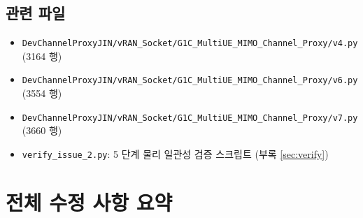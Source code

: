 \documentclass[11pt,a4paper]{article}
\begin{document}
\subsection{관련 파일}
\begin{itemize}
  \item \texttt{DevChannelProxyJIN/vRAN\_Socket/G1C\_MultiUE\_MIMO\_Channel\_Proxy/v4.py}
        \quad (3164 행)
  \item \texttt{DevChannelProxyJIN/vRAN\_Socket/G1C\_MultiUE\_MIMO\_Channel\_Proxy/v6.py}
        \quad (3554 행)
  \item \texttt{DevChannelProxyJIN/vRAN\_Socket/G1C\_MultiUE\_MIMO\_Channel\_Proxy/v7.py}
        \quad (3660 행)
  \item \texttt{verify\_issue\_2.py}: 5 단계 물리 일관성 검증 스크립트 (부록 \ref{sec:verify})
\end{itemize}

\section{전체 수정 사항 요약}
\label{sec:summary}
\end{document}
